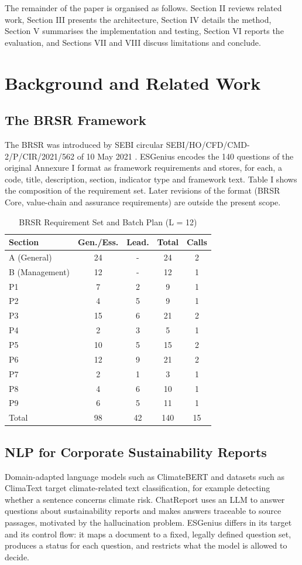 \documentclass[conference]{IEEEtran}
\begin{document}
The remainder of the paper is organised as follows. Section II reviews related work, Section III presents the architecture, Section IV details the method, Section V summarises the implementation and testing, Section VI reports the evaluation, and Sections VII and VIII discuss limitations and conclude.

\section{Background and Related Work}
\subsection{The BRSR Framework}
The BRSR was introduced by SEBI circular SEBI/HO/CFD/CMD-2/P/CIR/2021/562 of 10 May 2021 \cite{b1}. ESGenius encodes the 140 questions of the original Annexure I format as framework requirements and stores, for each, a code, title, description, section, indicator type and framework text. Table I shows the composition of the requirement set. Later revisions of the format (BRSR Core, value-chain and assurance requirements) are outside the present scope.

\begin{table}[!t]\centering\caption{BRSR Requirement Set and Batch Plan (L = 12)}
\footnotesize\begin{tabular}{lcccc}\toprule
Section & Gen./Ess. & Lead. & Total & Calls \\ \midrule
A (General) & 24 & - & 24 & 2 \\
B (Management) & 12 & - & 12 & 1 \\
P1 & 7 & 2 & 9 & 1 \\
P2 & 4 & 5 & 9 & 1 \\
P3 & 15 & 6 & 21 & 2 \\
P4 & 2 & 3 & 5 & 1 \\
P5 & 10 & 5 & 15 & 2 \\
P6 & 12 & 9 & 21 & 2 \\
P7 & 2 & 1 & 3 & 1 \\
P8 & 4 & 6 & 10 & 1 \\
P9 & 6 & 5 & 11 & 1 \\
Total & 98 & 42 & 140 & 15 \\
\bottomrule\end{tabular}
\end{table}
\subsection{NLP for Corporate Sustainability Reports}
Domain-adapted language models such as ClimateBERT \cite{b6} and datasets such as ClimaText \cite{b7} target climate-related text classification, for example detecting whether a sentence concerns climate risk. ChatReport \cite{b5} uses an LLM to answer questions about sustainability reports and makes answers traceable to source passages, motivated by the hallucination problem. ESGenius differs in its target and its control flow: it maps a document to a fixed, legally defined question set, produces a status for each question, and restricts what the model is allowed to decide.
\end{document}
